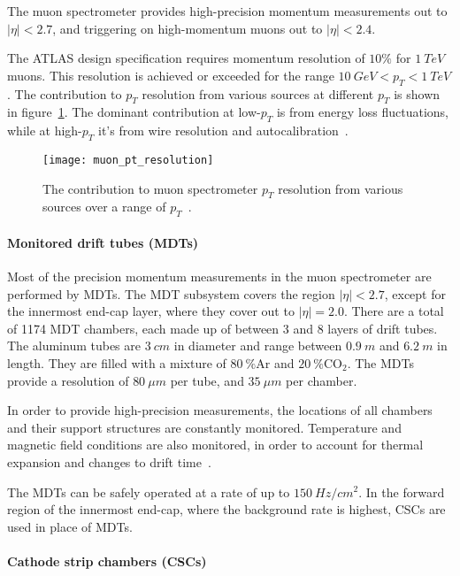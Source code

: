 The muon spectrometer provides high-precision momentum measurements out to $|\eta| < 2.7$,
and triggering on high-momentum muons out to $|\eta| < 2.4$.

The ATLAS design specification requires momentum resolution of $10\%$ for $1~TeV$ muons.
This resolution is achieved or exceeded for the range $10~GeV < p_T < 1~TeV$.
The contribution to $p_T$ resolution from various sources at different $p_T$ is shown in figure~\ref{fig:muon_resolution}.
The dominant contribution at low-$p_T$ is from energy loss fluctuations,
while at high-$p_T$ it's from wire resolution and autocalibration~\cite{muon-2003}.

\begin{figure}[!ht]\centering
\texttt{[image: muon\_pt\_resolution]}
\caption{The contribution to muon spectrometer $p_T$ resolution from various sources over a range of $p_T$~\cite{muon-2003}.}
\label{fig:muon_resolution}
\end{figure}

\paragraph{Monitored drift tubes (MDTs)}
Most of the precision momentum measurements in the muon spectrometer are performed by MDTs.
The MDT subsystem covers the region $|\eta| < 2.7$, except for the innermost end-cap layer,
where they cover out to $|\eta| = 2.0$.
There are a total of 1174 MDT chambers, each made up of between 3 and 8 layers of drift tubes.
The aluminum tubes are $3~cm$ in diameter and range between $0.9~m$ and $6.2~m$ in length.
They are filled with a mixture of $80~\% \mathrm{Ar}$ and  $20~\% \mathrm{CO_2}$.
The MDTs provide a resolution of $80~\mu m$ per tube, and $35~\mu m$ per chamber.

In order to provide high-precision measurements, the locations of all chambers and their support structures are constantly monitored.
Temperature and magnetic field conditions are also monitored, in order to account for thermal expansion and changes to drift time~\cite{muon-2003}.

The MDTs can be safely operated at a rate of up to $150~Hz/cm^2$.
In the forward region of the innermost end-cap, where the background rate is highest, CSCs are used in place of MDTs.

\paragraph{Cathode strip chambers (CSCs)}

